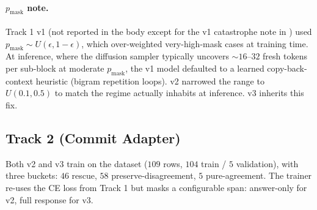 \paragraph{$p_\text{mask}$ note.}
Track 1 v1 (not reported in the body except for the v1 catastrophe
note in ) used $p_\text{mask} \sim U(\epsilon,
1{-}\epsilon)$, which over-weighted very-high-mask cases at
training time.  At inference, where the diffusion sampler
typically uncovers $\sim 16\text{--}32$ fresh tokens per sub-block
at moderate $p_\text{mask}$, the v1 model defaulted to a learned
copy-back-context heuristic (bigram repetition loops).  v2 narrowed
the range to $U(0.1, 0.5)$ to match the regime \LLaDA{} actually
inhabits at inference.  v3 inherits this fix.

\subsection{Track 2 (Commit Adapter)}

Both v2 and v3 train on the
 dataset ($109$ rows,
$104$ train / $5$ validation), with three buckets: $46$ rescue,
$58$ preserve-disagreement, $5$ pure-agreement.  The trainer
re-uses the \LLaDA{} CE loss from Track 1 but masks a configurable
span: answer-only \code{[answer\_start, answer\_end)} for v2, full
response \code{[prompt\_len, response\_end)} for v3.


